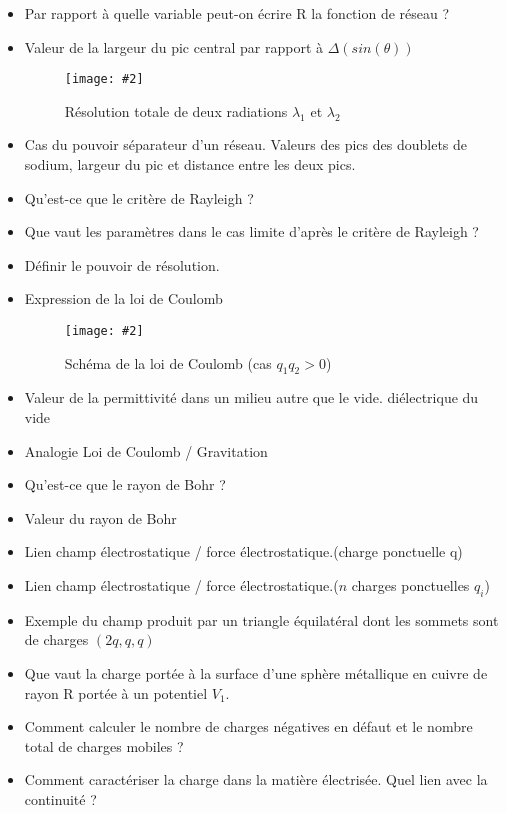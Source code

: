 \documentclass[a4paper, 11pt, hidelinks]{article}
\newcommand{\img}[4]{\begin{figure}[!ht]
    \centering
    \texttt{[image: \#2]}
    \caption{#3}
    \label{#4}
    \end{figure} }
\begin{document}
\begin{itemize}
    \item Par rapport à quelle variable peut-on écrire R la fonction de réseau ? \cite{Chapitre6}
    \item Valeur de la largeur du pic central par rapport à $\Delta (sin(\theta))$ \cite{Chapitre6}
    \img{0.5}{Images/Resolution totale de deux radiations lambda1 et lambda2.PNG}{Résolution totale de deux radiations $\lambda_1$ et $\lambda_2$}{Figure 4}
    \item Cas du pouvoir séparateur d'un réseau. Valeurs des pics des doublets de sodium, largeur du pic et distance entre les deux pics. \cite{Chapitre6}
    \item Qu'est-ce que le critère de Rayleigh ? \cite{Chapitre6}
    \item Que vaut les paramètres dans le cas limite d'après le critère de Rayleigh ? \cite{Chapitre6}
    \item Définir le pouvoir de résolution. \cite{Chapitre6}
    \item Expression de la loi de Coulomb \cite{Chapitre9}
    \img{0.5}{Images/Definition de la loi de Coulomb (cas q1q2 superieur a 0).PNG}{Schéma de la loi de Coulomb (cas $q_1q_2>0$)}{Figure 5}
    \item Valeur de la permittivité dans un milieu autre que le vide. \cite{Chapitre9} diélectrique du vide \cite{Chapitre9}
    \item Analogie Loi de Coulomb / Gravitation \cite{Chapitre9}
    \item Qu'est-ce que le rayon de Bohr ? \cite{Chapitre9}
    \item Valeur du rayon de Bohr \cite{Chapitre9}
    \item Lien champ électrostatique / force électrostatique.(charge ponctuelle q) \cite{Chapitre9}
    \item Lien champ électrostatique / force électrostatique.($n$ charges ponctuelles $q_i$) \cite{Chapitre9}
    \item Exemple du champ produit par un triangle équilatéral dont les sommets sont de charges $(2q,q,q)$ \cite{Chapitre9}
    \item Que vaut la charge portée à la surface d'une sphère métallique en cuivre de rayon R portée à un potentiel $V_1$. \cite{Chapitre9}
    \item Comment calculer le nombre de charges négatives en défaut et le nombre total de charges mobiles ? \cite{Chapitre9} 
    \item Comment caractériser la charge dans la matière électrisée. Quel lien avec la continuité ? \cite{Chapitre9}

\end{itemize}
\end{document}
